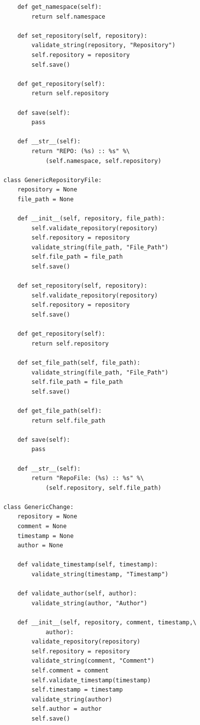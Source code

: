 \begin{lstlisting}
    def get_namespace(self):
        return self.namespace

    def set_repository(self, repository):
        validate_string(repository, "Repository")
        self.repository = repository
        self.save()

    def get_repository(self):
        return self.repository

    def save(self):
        pass

    def __str__(self):
        return "REPO: (%s) :: %s" %\
            (self.namespace, self.repository)

class GenericRepositoryFile:
    repository = None
    file_path = None

    def __init__(self, repository, file_path):
        self.validate_repository(repository)
        self.repository = repository
        validate_string(file_path, "File_Path")
        self.file_path = file_path
        self.save()

    def set_repository(self, repository):
        self.validate_repository(repository)
        self.repository = repository
        self.save()

    def get_repository(self):
        return self.repository

    def set_file_path(self, file_path):
        validate_string(file_path, "File_Path")
        self.file_path = file_path
        self.save()

    def get_file_path(self):
        return self.file_path

    def save(self):
        pass

    def __str__(self):
        return "RepoFile: (%s) :: %s" %\
            (self.repository, self.file_path)

class GenericChange:
    repository = None
    comment = None
    timestamp = None
    author = None

    def validate_timestamp(self, timestamp):
        validate_string(timestamp, "Timestamp")

    def validate_author(self, author):
        validate_string(author, "Author")

    def __init__(self, repository, comment, timestamp,\
            author):
        validate_repository(repository)
        self.repository = repository
        validate_string(comment, "Comment")
        self.comment = comment
        self.validate_timestamp(timestamp)
        self.timestamp = timestamp
        validate_string(author)
        self.author = author
        self.save()


\end{lstlisting}
